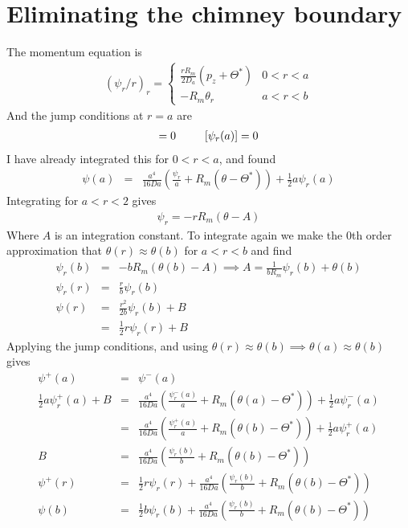 \documentclass{article}
\begin{document}
\section{Eliminating the chimney boundary}

The momentum equation is
\begin{eqnarray}
(\psi_r / r)_r  = \left\{
  \begin{array}{lr}
   \frac{r R_m}{2 D_a} (p_z + \Theta^*) & 0 < r < a\\
   - R_m \theta_r   & a < r <  b
  \end{array} \right.
\end{eqnarray}
And the jump conditions at $r=a$ are
\begin{eqnarray}
[\psi(a)] = 0 \hspace{6ex} [\psi_r(a)] = 0
\end{eqnarray}
I have already integrated this for $0 < r <a$, and found 
\begin{eqnarray}
\psi(a) &=& \frac{a^4}{16 Da} \left(\frac{\psi_r}{a} + R_m (\theta - \Theta^*) \right)   + \frac{1}{2} a \psi_r(a)
\end{eqnarray}
Integrating for $a < r < 2$ gives
\begin{eqnarray}
\psi_r  = -r R_m (\theta - A)
\end{eqnarray}
Where $A$ is an integration constant. To integrate again we make the 0th order approximation that $\theta(r) \approx \theta(b)$ for $a < r < b$ and find
\begin{eqnarray}
\psi_r(b) &=& - b R_m(\theta(b) - A) \implies A = \frac{1}{b R_m} \psi_r(b) + \theta(b) \\
\psi_r(r) &=& \frac{r}{b} \psi_r(b) \\
\psi(r) &=& \frac{r^2}{2 b} \psi_r(b) + B \\
&=& \frac{1}{2} r \psi_r (r) + B
\end{eqnarray}
Applying the jump conditions, and using $\theta(r) \approx \theta(b) \implies \theta(a) \approx \theta(b)$ gives
\begin{eqnarray}
\psi^+(a) &=& \psi^-(a) \\
\frac{1}{2} a \psi^+_r (a) + B &=& \frac{a^4}{16 Da} \left(\frac{\psi^-_r(a)}{a} + R_m (\theta(a) - \Theta^*) \right)   + \frac{1}{2} a \psi^-_r(a) \\
&=& \frac{a^4}{16 Da} \left(\frac{\psi^+_r(a)}{a} + R_m (\theta(b) - \Theta^*) \right)   + \frac{1}{2} a \psi^+_r(a) \\
B &=& \frac{a^4}{16 Da} \left(\frac{\psi_r(b)}{b} + R_m (\theta(b) - \Theta^*) \right) \\
\psi^+(r) &=& \frac{1}{2} r \psi_r (r) + \frac{a^4}{16 Da} \left(\frac{\psi_r(b)}{b} + R_m (\theta(b) - \Theta^*) \right) \\
\psi(b) &=&\frac{1}{2} b \psi_r (b) + \frac{a^4}{16 Da} \left(\frac{\psi_r(b)}{b} + R_m (\theta(b) - \Theta^*) \right) 
\end{eqnarray}
\end{document}
